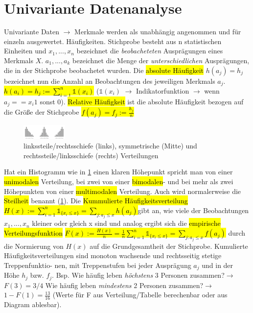 \section{Univariante Datenanalyse}
Univariante Daten $\rightarrow$ Merkmale werden als unabhängig angenommen und für einzeln ausgewertet. Häufigkeiten. Stichprobe besteht aus n statistischen Einheiten und $x_1, ..., x_n$ bezeichnet die \emph{beobacheteten} Ausprägungen eines Merkmals $X$. $a_1, ..., a_k$ bezeichnet die Menge der \emph{unterschiedlichen} Ausprägungen, die in der Stichprobe beobachetet wurden.
Die \hl{absolute Häufigkeit} $h(a_j) = h_j$ bezeichnet nun die Anzahl an Beobachtungen des jeweiligen Merkmals $a_j$. \hl{$h(a_i) = h_j := \sum^{n}_{i=1}\mathds{1}(x_i)$} ($\mathds{1}(x_i)$ $\rightarrow$ Indikatorfunktion $\rightarrow$ wenn $a_j == x_i 1$ sonst $0$). \hl{Relative Häufigkeit} ist die absolute Häufigkeit bezogen auf die Größe der Stichprobe \hl{$f(a_j) = f_j := \frac{h_j}{n}$} 
\begin{figure}
    \centering
    \includegraphics[width=0.2\textwidth]{images/2.3_histogramme_schiefheit.png}
    \caption{linkssteile/rechtsschiefe (links), symmetrische (Mitte) und rechtssteile/linksschiefe
    (rechts) Verteilungen}
    \vspace{-12mm}
    \label{fig:schiefheit}
\end{figure}
Hat ein Histogramm wie in \cref{fig:schiefheit} einen klaren Höhepunkt spricht man von einer \hl{unimodalen} Verteilung, bei zwei von einer \hl{bimodalen}- und bei mehr als zwei Höhepunkten von einer \hl{multimodalen} Verteilung. Auch wird normalerweise die \hl{Steilheit} benannt (\cref{fig:schiefheit}).
Die \hl{Kummulierte Häufigkeitsverteilung} \hl{$H(x):=\sum^{n}_{i=1}\mathds{1}_{\{x_i \leq x\}} = \underset{j:a_j\leq x}{\sum}h(a_j)$}gibt an, wie viele der Beobachtungen $x_1, ..., x_n$ kleiner oder gleich x sind und analog ergibt sich die \hl{empirische Verteilungsfunktion} \hl{$F(x) := \frac{H(x)}{n} = \frac{1}{n}\sum^{n}_{i=1}\mathds{1}_{\{x_i \leq x\}} = \underset{j:a_j\leq x}{\sum}f(a_j)$} durch die Normierung von $H(x)$ auf die Grundgesamtheit der Stichprobe.  Kumulierte Häufigkeitsverteilungen sind monoton wachsende und rechtsseitig stetige Treppenfunktio-
nen, mit Treppenstufen bei jeder Ausprägung $a_j$ und in der Höhe $h_j$ bzw. $f_j$. Bsp. \glqq Wie häufig leben \emph{höchstens} 3 Personen zusammen?\grqq $\rightarrow$ $F(3) = 3/4$  \glqq Wie häufig leben \emph{mindestens} 2 Personen zusammen?\grqq $\rightarrow$ $1 - F(1) = \frac{13}{16}$ (Werte für F aus Verteilung/Tabelle berechenbar oder aus Diagram ablesbar).
